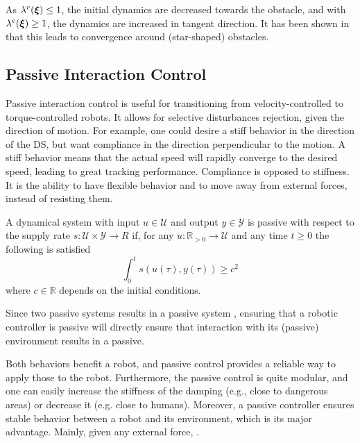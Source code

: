 \documentclass[conference]{IEEEtran}
\begin{document}
As $\lambda^r(\boldsymbol{\xi}) \leq 1$, the initial dynamics are decreased towards the obstacle, and with $\lambda^e(\boldsymbol{\xi}) \geq 1$, the dynamics are increased in tangent direction. It has been shown in \cite{huber2022avoiding} that this leads to convergence around (star-shaped) obstacles.

\subsection{Passive Interaction Control} \label{sec:trad_passive}
Passive interaction control \cite{kronander2015passive}is useful for transitioning from velocity-controlled to torque-controlled robots. It allows for selective disturbances rejection, given the direction of motion. For example, one could desire a stiff behavior in the direction of the DS, but want compliance in the direction perpendicular to the motion.
A stiff behavior means that the actual speed will rapidly converge to the desired speed, leading to great tracking performance. Compliance is opposed to stiffness. It is the ability to have flexible behavior and to move away from external forces, instead of resisting them.

\begin{definition}
  A dynamical system with input $ u \in \mathcal{U}$ and output $y \in \mathcal{Y}$ is passive with respect to the supply rate $s : \mathcal{U} \times \mathcal{Y} \rightarrow{R}$ if, for any $u: \mathbb{R}_{>0} \rightarrow \mathcal{U}$ and any time $t \geq 0$ the following is satisfied
  \begin{equation}
    \int_0^t s \left( u(\tau),  y (\tau) \right) \geq c^2
  \end{equation}
  where $c \in \mathbb{R}$ depends on the initial conditions.
\end{definition}

Since two passive systems results in a passive system \cite{sepulchre2012constructive}, ensuring that a robotic controller is passive will directly ensure that interaction with its (passive) environment results in a passive.

Both behaviors benefit a robot, and passive control provides a reliable way to apply those to the robot.
Furthermore, the passive control is quite modular, and one can easily increase the stiffness of the damping (e.g., close to dangerous areas) or decrease it (e.g. close to humans). Moreover, a passive controller ensures stable behavior between a robot and its environment, which is its major advantage. Mainly, given any external force,
.
\end{document}
